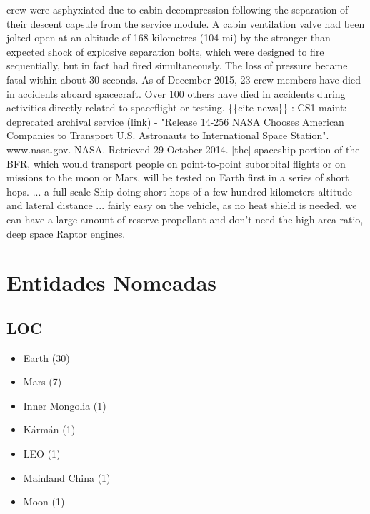 \documentclass[12pt]{article}
\begin{document}
crew were asphyxiated due to cabin decompression following the separation of their descent capsule from the service module. A cabin ventilation valve had been jolted open at an altitude of 168 kilometres (104 mi) by the stronger-than-expected shock of explosive separation bolts, which were designed to fire sequentially, but in fact had fired simultaneously. The loss of pressure became fatal within about 30 seconds. As of December 2015, 23 crew members have died in accidents aboard spacecraft. Over 100 others have died in accidents during activities directly related to spaceflight or testing. \{\{cite news\}\} : CS1 maint: deprecated archival service (link) - "Release 14-256 NASA Chooses American Companies to Transport U.S. Astronauts to International Space Station". www.nasa.gov. NASA. Retrieved 29 October 2014. [the] spaceship portion of the BFR, which would transport people on point-to-point suborbital flights or on missions to the moon or Mars, will be tested on Earth first in a series of short hops. ... a full-scale Ship doing short hops of a few hundred kilometers altitude and lateral distance ... fairly easy on the vehicle, as no heat shield is needed, we can have a large amount of reserve propellant and don't need the high area ratio, deep space Raptor engines.

\section{Entidades Nomeadas}

\subsection*{LOC}
\begin{itemize}
\item Earth (30)
\item Mars (7)
\item Inner Mongolia (1)
\item Kármán (1)
\item LEO (1)
\item Mainland China (1)
\item Moon (1)
\end{itemize}
\end{document}
